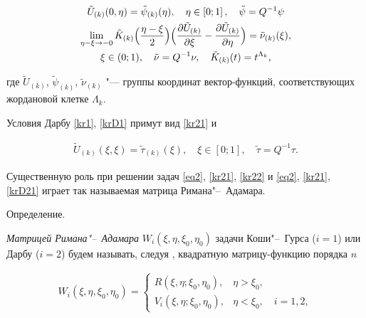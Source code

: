 \begin{gather}

  \label{kr21}

  \tilde{U}_{(k)}(0,\eta)=\tilde{\psi}_{(k)}(\eta), \quad  \eta \in \left[0; 1\right], \quad \tilde{\psi}=Q^{-1} \psi

\\

  \label{kr22}

  \lim\limits_{ \eta - \xi \to -0} \tilde{K}_{(k)} \Bigl(\frac{\eta-\xi}{2}\Bigr)

  \Bigl(\frac{\partial \tilde{U}_{(k)}}{\partial{\xi}}-\frac{\partial \tilde{U}_{(k)}}{\partial{\eta}}\Bigr)=\tilde{\nu}_{(k)}(\xi),\\

  \xi \in (0; 1),\quad  \tilde{\nu}=Q^{-1} \nu, \quad  \tilde{K}_{(k)}(t)=t^{\Lambda_k},

\end{gather}

где $\tilde{U}_{(k)}$, $\tilde{\psi}_{(k)}$,  $\tilde{\nu}_{(k)}$ "--- группы координат вектор-функций, соответствующих жордановой клетке $\Lambda_k$.

Условия Дарбу \eqref{kr1}, \eqref{krD1} примут вид \eqref{kr21} и 

\begin{gather}

  \label{krD21}

  \tilde{U}_{(k)}(\xi,\xi)=\tilde{\tau}_{(k)}(\xi),\quad  \xi \in \left[0; 1\right], \quad \tilde{\tau}=Q^{-1}\tau.

\end{gather}

Существенную роль при решении задач \eqref{eq2}, \eqref{kr21}, \eqref{kr22} и \eqref{eq2}, \eqref{kr21}, \eqref{krD21} играет так называемая матрица Римана"--~Адамара.



\smallskip

{\small \sc Определение.}

\textit{Матрицей Римана"--~Адамара} $W_i(\xi,\eta,\xi_0,\eta_0)$ задачи Коши"--~Гурса ($i=1$) или Дарбу ($i=2$) будем называть, следуя \cite{Andreev}, квадратную матрицу-функцию порядка $n$

\begin{gather*}

 W_i(\xi,\eta,\xi_0,\eta_0)= 

\begin{cases}

  R(\xi,\eta;\xi_0,\eta_0), & \eta>\xi_0,\\[1mm]

  V_i(\xi,\eta;\xi_0,\eta_0), & \eta<\xi_0, \quad  i=1, 2,

\end{cases}

\end{gather*}

